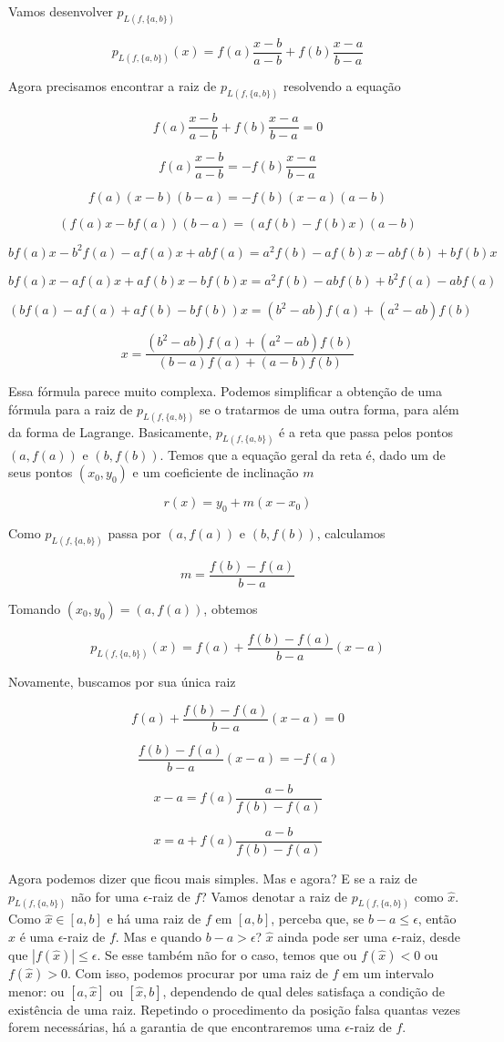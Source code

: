 \documentclass[]{article}
\numberwithin{equation}{section}
\begin{document}
Vamos desenvolver $p_{L(f, \{a, b\})}$

$$
p_{L(f, \{a, b\})}(x) = f(a) \frac{x - b}{a - b} + f(b) \frac{x - a}{b - a}
$$

Agora precisamos encontrar a raiz de $p_{L(f, \{a, b\})}$ resolvendo a equação

$$
f(a) \frac{x - b}{a - b} + f(b) \frac{x - a}{b - a} = 0
$$

$$
f(a) \frac{x - b}{a - b} = -f(b) \frac{x - a}{b - a}
$$

$$
f(a)(x - b)(b - a) = -f(b)(x - a)(a - b)
$$

$$
(f(a)x - bf(a))(b - a) = (af(b) - f(b)x)(a - b)
$$

$$
bf(a)x - b^2f(a) - af(a)x + abf(a) = a^2f(b) - af(b)x - abf(b) + bf(b)x
$$

$$
bf(a)x - af(a)x + af(b)x - bf(b)x = a^2f(b) - abf(b) + b^2f(a) - abf(a)
$$

$$
(bf(a) - af(a) + af(b) - bf(b))x = (b^2 - ab)f(a) + (a^2 - ab)f(b)
$$

$$
x = \frac{(b^2 - ab)f(a) + (a^2 - ab)f(b)}{(b - a)f(a) + (a - b)f(b)}
$$

Essa fórmula parece muito complexa. Podemos simplificar a obtenção de uma fórmula para a raiz de $p_{L(f, \{a, b\})}$ se o tratarmos de uma outra forma, para além da forma de Lagrange. Basicamente, $p_{L(f, \{a, b\})}$ é a reta que passa pelos pontos $(a, f(a))$ e $(b, f(b))$. Temos que a equação geral da reta é, dado um de seus pontos $(x_0, y_0)$ e um coeficiente de inclinação $m$

$$
r(x) = y_0 + m(x - x_0)
$$

Como $p_{L(f, \{a, b\})}$ passa por $(a, f(a))$ e $(b, f(b))$, calculamos

$$
m = \frac{f(b) - f(a)}{b - a}
$$

Tomando $(x_0, y_0) = (a, f(a))$, obtemos

$$
p_{L(f, \{a, b\})}(x) = f(a) + \frac{f(b) - f(a)}{b - a}(x - a)
$$

Novamente, buscamos por sua única raiz

$$
f(a) + \frac{f(b) - f(a)}{b - a}(x - a) = 0
$$

$$
\frac{f(b) - f(a)}{b - a}(x - a) = -f(a)
$$

$$
x - a = f(a) \frac{a - b}{f(b) - f(a)}
$$

$$
x = a + f(a) \frac{a - b}{f(b) - f(a)}
$$

Agora podemos dizer que ficou mais simples. Mas e agora? E se a raiz
de $p_{L(f, \{a, b\})}$ não for uma $\epsilon$-raiz de $f$? Vamos
denotar a raiz de $p_{L(f, \{a, b\})}$ como $\hat{x}$. Como
$\hat{x} \in [a, b]$ e há uma raiz de $f$ em $[a, b]$, perceba que, se
$b - a \leq \epsilon$, então $\hat{x}$ é uma $\epsilon$-raiz de
$f$. Mas e quando $b - a > \epsilon$? $\hat{x}$ ainda pode ser uma
$\epsilon$-raiz, desde que $|f(\hat{x})| \leq \epsilon$. Se esse
também não for o caso, temos que ou $f(\hat{x}) < 0$ ou
$f(\hat{x}) > 0$. Com isso, podemos procurar por uma raiz de $f$ em um
intervalo menor: ou $[a, \hat{x}]$ ou $[\hat{x}, b]$, dependendo de
qual deles satisfaça a condição de existência de uma raiz. Repetindo o
procedimento da posição falsa quantas vezes forem necessárias, há a
garantia de que encontraremos uma $\epsilon$-raiz de $f$.
\end{document}
